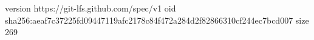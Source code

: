 version https://git-lfs.github.com/spec/v1
oid sha256:aeaf7c37225fd09447119afc2178c84f472a284d2f82866310cf244ec7bcd007
size 269
